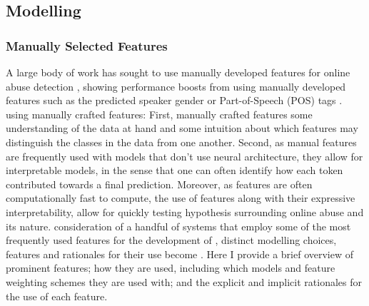 \subsection{Modelling}  
\subsubsection{Manually Selected Features}  
A large body of work has sought to use manually developed features for online abuse detection \citep[e.g.]{Davidson:2017,Waseem:2017,Wiegand:2019,Fortuna:2018}, showing performance boosts from using manually developed features such as the predicted speaker gender \citep{Waseem-Hovy:2016} or Part-of-Speech (POS) tags \citep{Davidson:2017}.  
 using manually crafted features: First,  manually crafted features  some understanding of the data at hand and some intuition about which features may distinguish the classes in the data from one another.  
Second, as manual features are frequently used with models that don't use neural architecture, they allow for interpretable models, in the sense that one can often identify how each token contributed towards a final prediction.  
Moreover, as features are often computationally fast to compute, the use of features along with their expressive interpretability, allow for quickly testing hypothesis surrounding online abuse and its nature.  
 consideration of a handful of systems that employ some of the most frequently used features for the development of , distinct modelling choices, features and rationales for their use become .  
Here I provide a brief overview of prominent features; how they are used, including which models and feature weighting schemes they are used with; and the explicit and implicit rationales for the use of each feature.  
  
